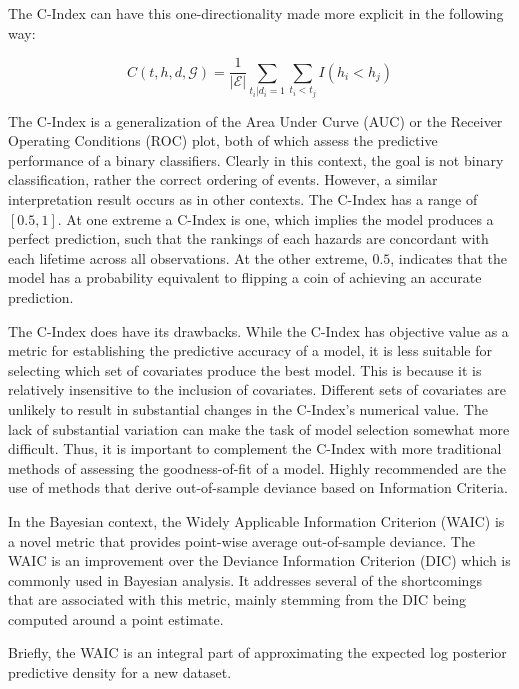 The C-Index can have this one-directionality made more explicit in the following way\cite{Steck2008}:

$$ C(t, h, d, \mathcal{G}) = \frac{1}{\mathcal{|E|}} \sum_{t_{i}|d_i = 1} \sum_{t_i < t_j} I(h_i < h_j) $$

The C-Index is a generalization of the Area Under Curve (AUC) or the Receiver Operating Conditions (ROC) plot, both of which assess the predictive performance of a binary classifiers\cite{NEEDED}. Clearly in this context, the goal is not binary classification, rather the correct ordering of events. However, a similar interpretation result occurs as in other contexts. The C-Index has a range of $[0.5,1]$. At one extreme a C-Index is one, which implies the model produces a perfect prediction, such that the rankings of each hazards are concordant with each lifetime across all observations. At the other extreme, $0.5$, indicates that the model has a probability equivalent to flipping a coin of achieving an accurate prediction. 


The C-Index does have its drawbacks. While the C-Index has objective value as a metric for establishing the predictive accuracy of a model, it is less suitable for selecting which set of covariates produce the best model. This is because it is relatively insensitive to the inclusion of covariates\cite{Cook2007}. Different sets of covariates are unlikely to result in substantial changes in the C-Index's numerical value. The lack of substantial variation can make the task of model selection somewhat more difficult. Thus, it is important to complement the C-Index with more traditional methods of assessing the goodness-of-fit of a model. Highly recommended are the use of methods that derive out-of-sample deviance based on Information Criteria. 

In the Bayesian context, the Widely Applicable Information Criterion (WAIC) is a novel metric that provides point-wise average out-of-sample deviance\cite{Watanabe2010}. The WAIC is an improvement over the Deviance Information Criterion (DIC) which is commonly used in Bayesian analysis. It addresses several of the shortcomings that are associated with this metric, mainly stemming from the DIC being computed around a point estimate. 

Briefly, the WAIC is an integral part of approximating the expected log posterior predictive density for a new dataset\cite{Vehtari2015}. 

